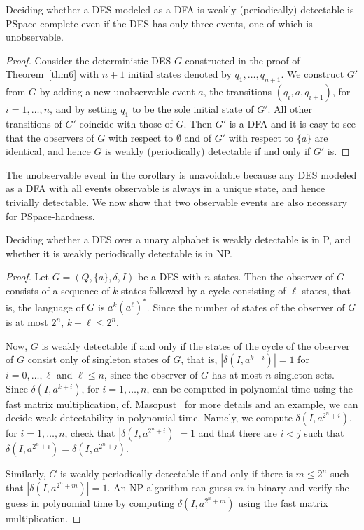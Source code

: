 \documentclass[twocolumn,amsthm]{autartx}
\begin{document}
  \begin{cor}\label{cor7}
    Deciding whether a DES modeled as a DFA is weakly (periodically) detectable is PSpace-complete even if the DES has only three events, one of which is unobservable.
  \end{cor}
  \begin{proof}
    Consider the deterministic DES $G$ constructed in the proof of Theorem~\ref{thm6} with $n+1$ initial states denoted by $q_1,\ldots,q_{n+1}$. We construct $G'$ from $G$ by adding a new unobservable event $a$, the transitions $(q_i,a,q_{i+1})$, for $i=1,\ldots,n$, and by setting $q_1$ to be the sole initial state of $G'$. All other transitions of $G'$ coincide with those of $G$. Then $G'$ is a DFA and it is easy to see that the observers of $G$ with respect to $\emptyset$ and of $G'$ with respect to $\{a\}$ are identical, and hence $G$ is weakly (periodically) detectable if and only if $G'$ is.
  \end{proof}

  The unobservable event in the corollary is unavoidable because any DES modeled as a DFA with all events observable is always in a unique state, and hence trivially detectable. We now show that two observable events are also necessary for PSpace-hardness.
  \begin{thm}\label{thm7}
    Deciding whether a DES over a unary alphabet is weakly detectable is in P, and whether it is weakly periodically detectable is in NP.
  \end{thm}
  \begin{proof}
    Let $G=(Q,\{a\},\delta,I)$ be a DES with $n$ states. Then the observer of $G$ consists of a sequence of $k$ states followed by a cycle consisting of $\ell$ states, that is, the language of $G$ is $a^k (a^{\ell})^*$. Since the number of states of the observer of $G$ is at most $2^n$, $k+\ell \le 2^n$. 
    
    Now, $G$ is weakly detectable if and only if the states of the cycle of the observer of $G$ consist only of singleton states of $G$, that is, $|\delta(I,a^{k+i})|=1$ for $i=0,\ldots,\ell$ and $\ell \le n$, since the observer of $G$ has at most $n$ singleton sets. Since $\delta(I,a^{k+i})$, for $i=1,\ldots,n$, can be computed in polynomial time using the fast matrix multiplication, cf. Masopust~\cite{Masopust2018} for more details and an example, we can decide weak detectability in polynomial time. Namely, we compute $\delta(I,a^{2^n+i})$, for $i=1,\ldots,n$, check that $|\delta(I,a^{2^n+i})|=1$ and that there are $i<j$ such that $\delta(I,a^{2^n+i})=\delta(I,a^{2^n+j})$.
    
    Similarly, $G$ is weakly periodically detectable if and only if there is $m\le 2^n$ such that $|\delta(I,a^{2^n+m})|=1$. An NP algorithm can guess $m$ in binary and verify the guess in polynomial time by computing $\delta(I,a^{2^n+m})$ using the fast matrix multiplication.
  \end{proof}
\end{document}
